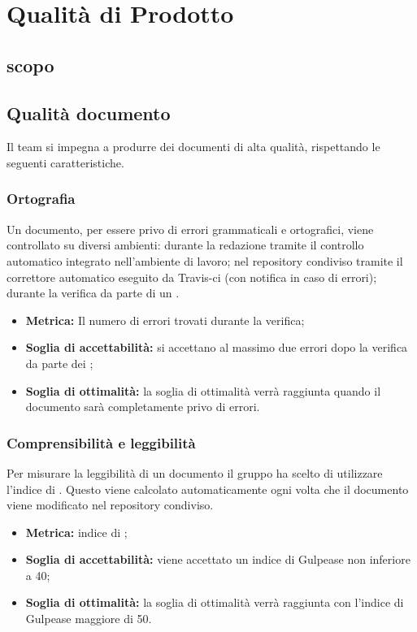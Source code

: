 \chapter{Qualità di Prodotto}
\label{prodotto}
\section{scopo}

\section{Qualità documento}
\label{documento}
Il team si impegna a produrre dei documenti di alta qualità, rispettando le seguenti caratteristiche.
\subsection{Ortografia}
Un documento, per essere privo di errori grammaticali e ortografici, viene controllato su diversi ambienti: durante la redazione tramite il controllo automatico integrato nell'ambiente di lavoro; nel repository condiviso tramite il correttore automatico eseguito da Travis-ci (con notifica in caso di errori); durante la verifica da parte di un .
\begin{itemize}
    \item \textbf{Metrica:} Il numero di errori trovati durante la verifica;
    \item \textbf{Soglia di accettabilità:} si accettano al massimo due errori dopo la verifica da parte dei ;
    \item \textbf{Soglia di ottimalità:} la soglia di ottimalità verrà raggiunta quando il documento sarà completamente privo di errori.
\end{itemize}
\subsection{Comprensibilità e leggibilità}
Per misurare la leggibilità di un documento il gruppo ha scelto di utilizzare l'indice di . Questo viene calcolato automaticamente ogni volta che il documento viene modificato nel repository condiviso.
\begin{itemize}
    \item \textbf{Metrica:} indice di ;
    \item \textbf{Soglia di accettabilità:} viene accettato un indice di Gulpease non inferiore a 40;
    \item \textbf{Soglia di ottimalità:} la soglia di ottimalità verrà raggiunta con l'indice di Gulpease maggiore di 50.
\end{itemize}
